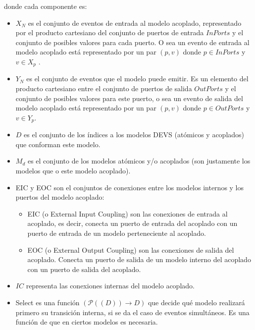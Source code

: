 	donde cada componente es:
	\begin{itemize}
	\item $X_N$ es el conjunto de eventos de entrada al modelo acoplado, representado por el producto cartesiano del conjunto de puertos de entrada $InPorts$ y
	 el conjunto de posibles valores para cada puerto. O sea un evento de entrada al modelo acoplado está representado por un par $(p, v)$ donde 
	$p \in InPorts$ y $v \in X_p$ .

	\item $Y_N$ es el conjunto de eventos que el modelo puede emitir. Es un elemento del producto cartesiano entre el conjunto de puertos de salida $OutPorts$ y
	 el conjunto de posibles valores para este puerto, o sea un evento de salida del modelo acoplado está representado por un par $(p, v)$ donde 
	$p \in OutPorts$ y $v \in Y_p$.

	\item $D$ es el conjunto de los índices a los modelos DEVS (atómicos y acoplados) que conforman este modelo. 

	\item ${M_d}$ es el conjunto de los modelos atómicos y/o acoplados (son justamente los modelos que  o  este modelo acoplado).

	\item EIC y EOC son el conjuntos de conexiones entre los modelos internos y los puertos del modelo acoplado:
	      \begin {itemize}
		  \item EIC (o External Input Coupling) son las conexiones de entrada al acoplado, es decir, conecta un puerto de entrada del acoplado con un 
			puerto de entrada de un modelo perteneciente al acoplado.
		  \item EOC (o External Output Coupling) son las conexiones de salida del acoplado. Conecta un puerto de salida de un modelo interno del
			 acoplado con un puerto de salida del acoplado.  
	     \end{itemize}

	\item $IC$ representa las conexiones internas del modelo acoplado.

	\item Select es una función $(\mathcal{P}((D)) \to D)$ que decide qué modelo realizará primero su transición interna, si se da el caso de 
		eventos simultáneos. Es una función de  que en ciertos modelos es necesaria.
	\end{itemize}

